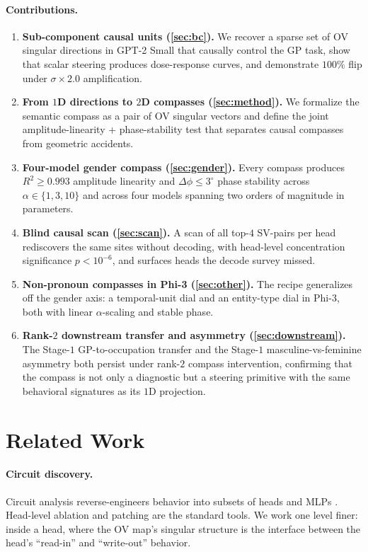 \paragraph{Contributions.}
\begin{enumerate}
    \item \textbf{Sub-component causal units (\cref{sec:bc}).} We
    recover a sparse set of OV singular directions in GPT-2 Small
    that causally control the GP task, show that scalar steering
    produces dose-response curves, and demonstrate $100\%$ flip
    under $\sigma\!\times\!2.0$ amplification.
    \item \textbf{From $1$D directions to $2$D compasses
    (\cref{sec:method}).} We formalize the semantic compass as a
    pair of OV singular vectors and define the joint
    amplitude-linearity + phase-stability test that separates
    causal compasses from geometric accidents.
    \item \textbf{Four-model gender compass (\cref{sec:gender}).}
    Every compass produces $R^2 \ge 0.993$ amplitude linearity and
    $\Delta\phi \le 3^\circ$ phase stability across
    $\alpha \in \{1, 3, 10\}$ and across four models spanning two
    orders of magnitude in parameters.
    \item \textbf{Blind causal scan (\cref{sec:scan}).} A scan of
    all top-$4$ SV-pairs per head rediscovers the same sites
    without decoding, with head-level concentration significance
    $p < 10^{-6}$, and surfaces heads the decode survey missed.
    \item \textbf{Non-pronoun compasses in Phi-3
    (\cref{sec:other}).} The recipe generalizes off the gender
    axis: a temporal-unit dial and an entity-type dial in Phi-3,
    both with linear $\alpha$-scaling and stable phase.
    \item \textbf{Rank-$2$ downstream transfer and asymmetry
    (\cref{sec:downstream}).} The Stage-$1$ GP-to-occupation
    transfer and the Stage-$1$ masculine-vs-feminine asymmetry
    both persist under rank-$2$ compass intervention, confirming
    that the compass is not only a diagnostic but a steering
    primitive with the same behavioral signatures as its $1$D
    projection.
\end{enumerate}

\section{Related Work}
\label{sec:related}

\paragraph{Circuit discovery.} Circuit analysis reverse-engineers
behavior into subsets of heads and MLPs
\citep{olah2020zoom,elhage2021mathematical,wang2023interpretability,conmy2023acdc,nanda2023progress,meng2022rome,marks2024sparse}.
Head-level ablation and patching are the standard tools. We work
one level finer: inside a head, where the OV map's singular
structure is the interface between the head's ``read-in'' and
``write-out'' behavior.

